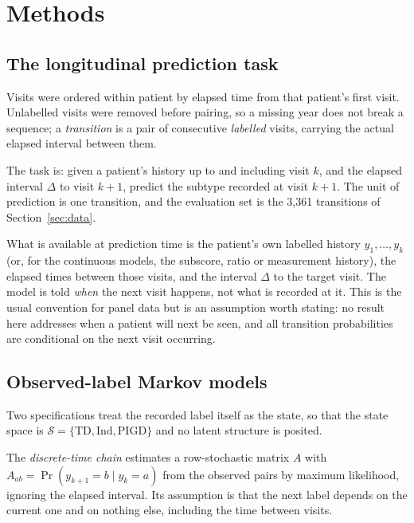 \documentclass[11pt]{article}
\newcommand{\TD}{\mathrm{TD}}
\newcommand{\PIGD}{\mathrm{PIGD}}
\newcommand{\Ind}{\mathrm{Ind}}
\begin{document}
\section{Methods}
\label{sec:methods}

\subsection{The longitudinal prediction task}
\label{sec:task}
Visits were ordered within patient by elapsed time from that patient's first
visit. Unlabelled visits were removed before pairing, so a missing year does not
break a sequence; a \emph{transition} is a pair of consecutive \emph{labelled}
visits, carrying the actual elapsed interval between them.

The task is: given a patient's history up to and including visit $k$, and the
elapsed interval $\Delta$ to visit $k+1$, predict the subtype recorded at visit
$k+1$. The unit of prediction is one transition, and the evaluation set is the
3,361 transitions of Section~\ref{sec:data}.

What is available at prediction time is the patient's own labelled history
$y_1,\dots,y_k$ (or, for the continuous models, the subscore, ratio or
measurement history), the elapsed times between those visits, and the interval
$\Delta$ to the target visit. The model is told \emph{when} the next visit
happens, not what is recorded at it. This is the usual convention for panel data
but is an assumption worth stating: no result here addresses when a patient will
next be seen, and all transition probabilities are conditional on the next visit
occurring.

\subsection{Observed-label Markov models}
Two specifications treat the recorded label itself as the state, so that the
state space is $\mathcal{S} = \{\TD, \Ind, \PIGD\}$ and no latent structure is
posited.

The \emph{discrete-time chain} estimates a row-stochastic matrix $A$ with
$A_{ab} = \Pr(y_{k+1} = b \mid y_k = a)$ from the observed pairs by maximum
likelihood, ignoring the elapsed interval. Its assumption is that the next label
depends on the current one and on nothing else, including the time between
visits.
\end{document}
